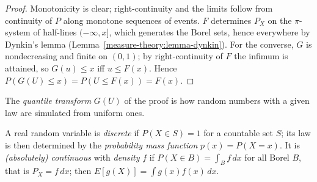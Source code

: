 \begin{proof}
Monotonicity is clear; right-continuity and the limits follow from continuity of $P$ along monotone sequences of events. $F$ determines $P_X$ on the $\pi$-system of half-lines $(-\infty, x]$, which generates the Borel sets, hence
everywhere by Dynkin's lemma (Lemma~\ref{measure-theory:lemma-dynkin}). For the converse, $G$ is nondecreasing and finite on $(0, 1)$; by right-continuity of $F$ the infimum is attained, so $G(u) \leq x$ iff $u \leq F(x)$.
Hence $P(G(U) \leq x) = P(U \leq F(x)) = F(x)$.
\end{proof}

The \emph{quantile transform} $G(U)$ of the proof is how random numbers with a given law are simulated from uniform ones.

\begin{definition}\label{probability:definition-discrete-continuous}
A real random variable is \emph{discrete} if $P(X \in S) = 1$ for a countable set $S$; its law is then determined by the \emph{probability mass function} $p(x) = P(X = x)$. It is \emph{(absolutely) continuous} with
\emph{density} $f$ if $P(X \in B) = \int_Bf\,dx$ for all Borel $B$, that is $P_X = f\,dx$; then $E[g(X)] = \int g(x)f(x)\,dx$.
\end{definition}

